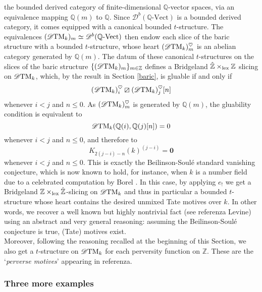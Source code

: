 \documentclass{article}
\theoremstyle{definition}
\newcommand{\Z}{\mathbb{Z}}
\newcommand{\orth}{\boxslash}
\newcommand{\lex}{\times_{\textnormal{lex}}}
\begin{document}
 the bounded derived category  of finite-dimensional $\mathbb{Q}$-vector spaces, via an equivalence mapping $\mathbb{Q}(m)$ to $\mathbb{Q}$. %
   Since $\mathscr{D}^b(\mathbb{Q}\text{-Vect})$ is a bounded derived category, it comes equipped with a canonical bounded $t$-structure. The equivalences $(\mathscr{D}\textnormal{TM}_k)_{m}\simeq \mathscr{D}^b(\mathbb{Q}\text{-Vect})$ then endow each slice of the baric structure with a bounded $t$-structure, whose heart $(\mathscr{D}\textnormal{TM}_k)_{m}^\heartsuit$ is an abelian category generated by $\mathbb{Q}(m)$. The datum of these canonical $t$-structures on the slices of the baric structure  $\{(\mathscr{D}\textnormal{TM}_k)_{m}\}_{m\in \mathbb{Z}}$ defines a Bridgeland $\hat{\Z}\lex \Z$ slicing on $\mathscr{D}\textnormal{TM}_k$, which, by the result in Section \ref{baric}, is gluable if and only if  
\[
(\mathscr{D}\textnormal{TM}_k)_{i}^\heartsuit\orth(\mathscr{D}\textnormal{TM}_k)_{j}^\heartsuit[n]
\]
 whenever $i<j$ and $n\leq 0$. As $(\mathscr{D}\textnormal{TM}_k)_{m}^\heartsuit$ is generated by $\mathbb{Q}(m)$, the gluability condition is equivalent to
 \[
   \mathscr{D}\textnormal{TM}_k(\mathbb{Q}(i),\mathbb{Q}(j)[n])=0
    \]
 whenever $i<j$ and $n\leq 0$, and therefore to    
\[
K_{2(j-i)-n}(k)^{(j-i)} = \mathbf{0}
\]  whenever  $i < j$ and $n \leq 0$. This is exactly the Beilinson-Soul\'e standard vanishing conjecture, which is now known to hold, for instance, when $k$ is a number field due to a celebrated computation by Borel \cite{??}. In this case, by applying $e_!$ we get a Bridgeland $\Z \lex \hat{\Z}$-slicing on $\mathscr{D}\textnormal{TM}_k$ and thus in particular a bounded $t$-structure whose heart contains the desired unmixed Tate motives over $k$. In other words, we recover a well known but highly nontrivial fact (see {\color{red} referenza Levine}) using an abstract and very general reasoning: assuming the Beilinson-Soul\'e conjecture is true, (Tate) motives exist. \\
   Moreover, following the reasoning recalled at the beginning of this Section, we also get a $t$-structure on $\mathscr{D}\textnormal{TM}_k$ for each perversity function on $\mathbb{Z}$. These are the `\textit{perverse motives}' appearing in {\color{red} referenza}. 

\subsubsection{Three more examples}
\end{document}
